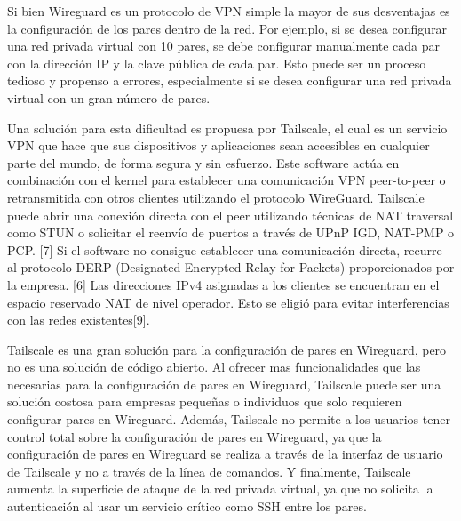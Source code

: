 \documentclass{article}
\begin{document}
Si bien Wireguard es un protocolo de VPN simple la mayor de sus desventajas es la configuración de los pares dentro de la red. Por ejemplo, si se desea configurar una red privada virtual con 10 pares, se debe configurar manualmente cada par con la dirección IP y la clave pública de cada par. Esto puede ser un proceso tedioso y propenso a errores, especialmente si se desea configurar una red privada virtual con un gran número de pares.

Una solución para esta dificultad es propuesa por Tailscale, el cual es un servicio VPN que hace que sus dispositivos y aplicaciones sean accesibles en cualquier parte del mundo, de forma segura y sin esfuerzo. Este software actúa en combinación con el kernel para establecer una comunicación VPN peer-to-peer o retransmitida con otros clientes utilizando el protocolo WireGuard. Tailscale puede abrir una conexión directa con el peer utilizando técnicas de NAT traversal como STUN o solicitar el reenvío de puertos a través de UPnP IGD, NAT-PMP o PCP. [7] Si el software no consigue establecer una comunicación directa, recurre al protocolo DERP (Designated Encrypted Relay for Packets) proporcionados por la empresa. [6] Las direcciones IPv4 asignadas a los clientes se encuentran en el espacio reservado NAT de nivel operador. Esto se eligió para evitar interferencias con las redes existentes[9]. %

Tailscale es una gran solución para la configuración de pares en Wireguard, pero no es una solución de código abierto. Al ofrecer mas funcionalidades que las necesarias para la configuración de pares en Wireguard, Tailscale puede ser una solución costosa para empresas pequeñas o individuos que solo requieren configurar pares en Wireguard. Además, Tailscale no permite a los usuarios tener control total sobre la configuración de pares en Wireguard, ya que la configuración de pares en Wireguard se realiza a través de la interfaz de usuario de Tailscale y no a través de la línea de comandos. Y finalmente, Tailscale aumenta la superficie de ataque de la red privada virtual, ya que no solicita la autenticación al usar un servicio crítico como SSH entre los pares.

\end{document}
